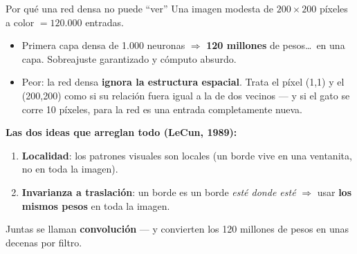 \documentclass{beamer}
\newcommand{\1}{\mathbb{I}}
\begin{document}
\begin{frame}{Por qué una red densa no puede ``ver''}
\small
Una imagen modesta de $200 \times 200$ píxeles a color $= 120.000$ entradas.
\pause
\begin{itemize}\itemsep5pt
  \item Primera capa densa de 1.000 neuronas $\Rightarrow$ \textbf{120 millones} de pesos\ldots\ en una capa. Sobreajuste garantizado y cómputo absurdo. \pause
  \item Peor: la red densa \textbf{ignora la estructura espacial}. Trata el píxel (1,1) y el (200,200) como si su relación fuera igual a la de dos vecinos --- y si el gato se corre 10 píxeles, para la red es una entrada completamente nueva. \pause
\end{itemize}

\vspace{0.15cm}
\textbf{Las dos ideas que arreglan todo (LeCun, 1989):}
\begin{enumerate}\itemsep4pt
  \item \textbf{Localidad}: los patrones visuales son locales (un borde vive en una ventanita, no en toda la imagen).
  \item \textbf{Invarianza a traslación}: un borde es un borde \emph{esté donde esté} $\Rightarrow$ usar \textbf{los mismos pesos} en toda la imagen.
\end{enumerate}
\pause
Juntas se llaman \textbf{convolución} --- y convierten los 120 millones de pesos en unas decenas por filtro.
\end{frame}
\end{document}
